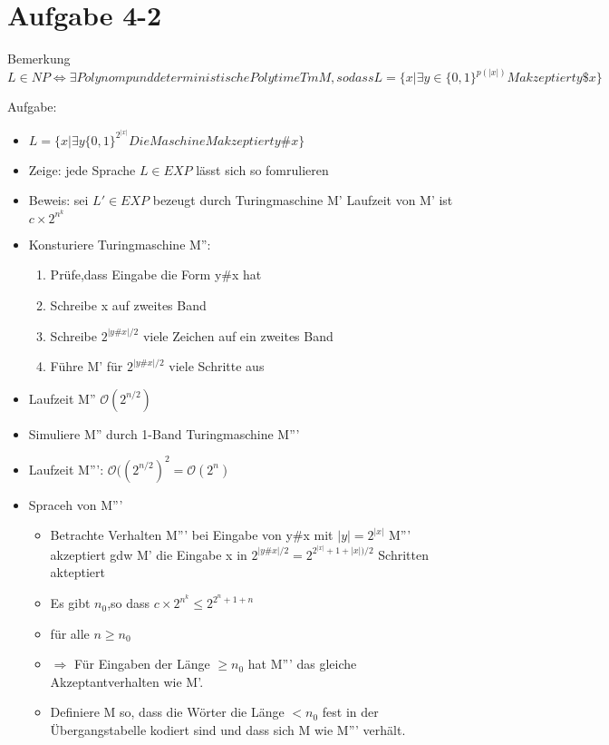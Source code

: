 \documentclass[12pt, oneside, a4paper, numbers=enddot, abstracton, parskip=full]{scrreprt}
\newcommand{\bigO}{\ensuremath{\mathcal{O}}}
\begin{document}
\section{Aufgabe 4-2}
Bemerkung
\begin{math}
  L\in NP \Leftrightarrow \exists Polynom p und deterministische
  Polytime Tm M,so dass
  L = \{x | \exists y \in \{0,1\}^{p(|x|)} M akzeptiert y \$ x \}
\end{math}

Aufgabe:
\begin{itemize}
\item \begin{math}
  L=\{ x | \exists y \{0,1\} ^ {2^{|x|}} Die Maschine M akzeptiert y
  \# x \}
\end{math}
\item Zeige: jede Sprache $L\in EXP $ lässt sich so fomrulieren
\item Beweis: sei $L' \in EXP$ bezeugt durch Turingmaschine M' Laufzeit von M' ist
  $ c \times 2 ^ {n^k}$

\item Konsturiere Turingmaschine M'':
  \begin{enumerate}
  \item Prüfe,dass Eingabe die Form y\#x hat
  \item Schreibe x auf zweites Band
  \item Schreibe $2^{|y\#x|/2}$ viele Zeichen auf ein zweites Band
  \item Führe M' für $2^{|y\#x|/2}$ viele Schritte aus
  \end{enumerate}
\item Laufzeit M'' $\bigO (2^{n/2}) $
\item Simuliere M'' durch 1-Band Turingmaschine M'''
\item Laufzeit M''': $\bigO ((2^{n/2})^2 = \bigO (2^n)$
\item Spraceh von M'''
  \begin{itemize}
  \item Betrachte Verhalten M''' bei Eingabe von y\#x mit
    $|y| =2^{|x|}$ M''' akzeptiert gdw M' die Eingabe x in
    $2^{|y\#x|/2} = 2^{2^{|x|} +1+|x|)/2}$ Schritten akteptiert
  \item Es gibt $n_0$,so dass $c\times2^{n^k} \leq  2^{2^n +1+n}$
  \item für alle $n\geq n_0$
  \item $\Rightarrow$ Für Eingaben der Länge $\geq n_0$ hat M''' das
    gleiche Akzeptantverhalten wie M'.            %
  \item Definiere M so, dass die Wörter die Länge $< n_0$  fest in der
    Übergangstabelle kodiert sind und dass sich M wie M''' verhält.
  \end{itemize}  
\end{itemize}
\end{document}
